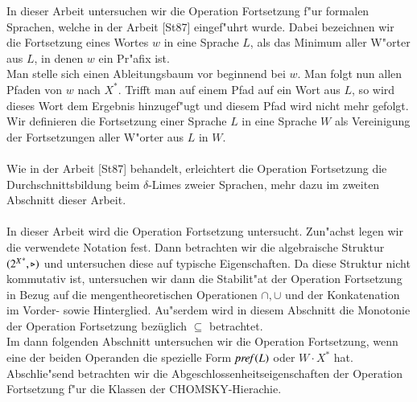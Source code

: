 In dieser Arbeit untersuchen wir die Operation Fortsetzung f"ur formalen Sprachen, welche in der Arbeit [St87] eingef"uhrt wurde. Dabei bezeichnen wir die Fortsetzung eines Wortes $w$ in eine Sprache $L$, als das Minimum aller W"orter aus $L$, in denen $w$ ein Pr"afix ist. 
\\Man stelle sich einen Ableitungsbaum vor beginnend bei $w$.
Man folgt nun allen Pfaden von $w$ nach $X^*$. Trifft man auf einem Pfad auf ein Wort aus $L$, so wird dieses Wort dem Ergebnis hinzugef"ugt und diesem Pfad wird nicht mehr gefolgt.\\
Wir definieren die Fortsetzung einer Sprache $L$ in eine Sprache $W$ als Vereinigung der Fortsetzungen aller W"orter aus $L$ in $W$.\\\\
Wie in der Arbeit [St87] behandelt, erleichtert die Operation Fortsetzung die Durchschnittsbildung beim $\delta$-Limes zweier Sprachen, mehr dazu im zweiten Abschnitt dieser Arbeit.\\\\
In dieser Arbeit wird die Operation Fortsetzung untersucht. Zun"achst legen wir die verwendete Notation fest. Dann betrachten wir die algebraische Struktur $({2^X}^*,\triangleright)$ und untersuchen diese auf typische Eigenschaften.
Da diese Struktur nicht kommutativ ist, untersuchen wir dann die Stabilit"at der Operation Fortsetzung in Bezug auf die mengentheoretischen Operationen $\cap,\cup$ und der Konkatenation im Vorder- sowie Hinterglied.
Au"serdem wird in diesem Abschnitt die Monotonie der Operation Fortsetzung bezüglich $\subseteq$ betrachtet.
\\Im dann folgenden Abschnitt untersuchen wir die Operation Fortsetzung, wenn eine der beiden Operanden die spezielle Form $\mathit{pref{(}}L)$ oder $W\cdot X^*$ hat. Abschlie"send betrachten wir die Abgeschlossenheitseigenschaften der Operation Fortsetzung f"ur die Klassen der CHOMSKY-Hierachie.



